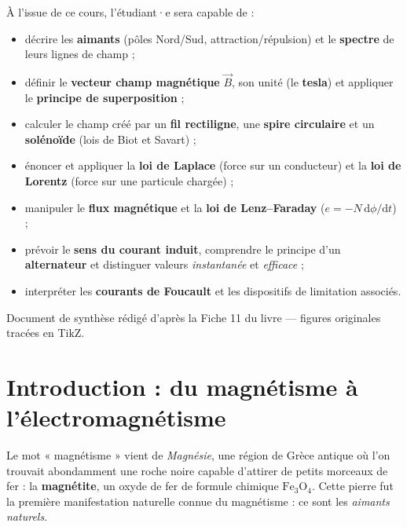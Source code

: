 \documentclass[11pt,a4paper]{article}
\newcommand{\Bvec}{\vec{B}}
\newcommand{\dd}{\mathrm{d}}
\begin{document}
\begin{tcolorbox}[boxbase,colback=primary!5,colframe=primary,width=15cm,
    title={\textsc{Objectifs pédagogiques de la fiche}}]
À l'issue de ce cours, l'étudiant·e sera capable de :
\begin{itemize}[leftmargin=1.6em,topsep=2pt,itemsep=1pt]
  \item décrire les \textbf{aimants} (pôles Nord/Sud, attraction/répulsion) et le \textbf{spectre}
        de leurs lignes de champ ;
  \item définir le \textbf{vecteur champ magnétique} $\Bvec$, son unité (le \textbf{tesla}) et appliquer
        le \textbf{principe de superposition} ;
  \item calculer le champ créé par un \textbf{fil rectiligne}, une \textbf{spire circulaire} et un
        \textbf{solénoïde} (lois de Biot et Savart) ;
  \item énoncer et appliquer la \textbf{loi de Laplace} (force sur un conducteur) et la
        \textbf{loi de Lorentz} (force sur une particule chargée) ;
  \item manipuler le \textbf{flux magnétique} et la \textbf{loi de Lenz--Faraday} ($e=-N\,\dd\phi/\dd t$) ;
  \item prévoir le \textbf{sens du courant induit}, comprendre le principe d'un \textbf{alternateur}
        et distinguer valeurs \emph{instantanée} et \emph{efficace} ;
  \item interpréter les \textbf{courants de Foucault} et les dispositifs de limitation associés.
\end{itemize}
\end{tcolorbox}

\vspace{0.5cm}
{\small\color{black!60} Document de synthèse rédigé d'après la Fiche 11 du livre — figures originales tracées en TikZ.}
\par
\endgroup

\newpage
\renewcommand{\contentsname}{\textcolor{primarydark}{Table des matières}}
\tableofcontents
\thispagestyle{fancy}
\newpage

\section{Introduction : du magnétisme à l'électromagnétisme}
Le mot « magnétisme » vient de \emph{Magnésie}, une région de Grèce antique où l'on trouvait
abondamment une roche noire capable d'attirer de petits morceaux de fer : la \textbf{magnétite},
un oxyde de fer de formule chimique $\mathrm{Fe_3O_4}$. Cette pierre fut la première manifestation
naturelle connue du magnétisme : ce sont les \emph{aimants naturels}.
\end{document}
